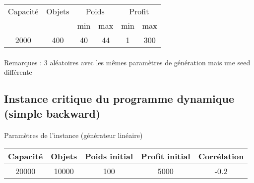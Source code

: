 \documentclass[12pt]{article}
\begin{document}
\begin{tabular}{|c|c|c|c|c|c|}
\hline
Capacité & Objets & \multicolumn{2}{c|}{Poids} & \multicolumn{2}{c|}{Profit} \\
\cline{3-6}
& & min & max & min & max \\
\hline
2000 & 400 & 40 & 44 & 1 & 300 \\
\hline
\end{tabular}

\begin{figure}[!h]
\begin{floatrow}
\end{floatrow}
\end{figure}

\paragraph{}Remarques : 3 aléatoires avec les mêmes paramètres de génération mais une seed différente

\subsection{Instance critique du programme dynamique (simple backward)}

\paragraph{}Paramètres de l'instance (générateur linéaire)

\begin{tabular}{|c|c|c|c|c|}
\hline
Capacité & Objets & Poids initial & Profit initial & Corrélation \\
\hline
20000 & 10000 & 100 & 5000 & -0.2 \\
\hline
\end{tabular}
\end{document}
